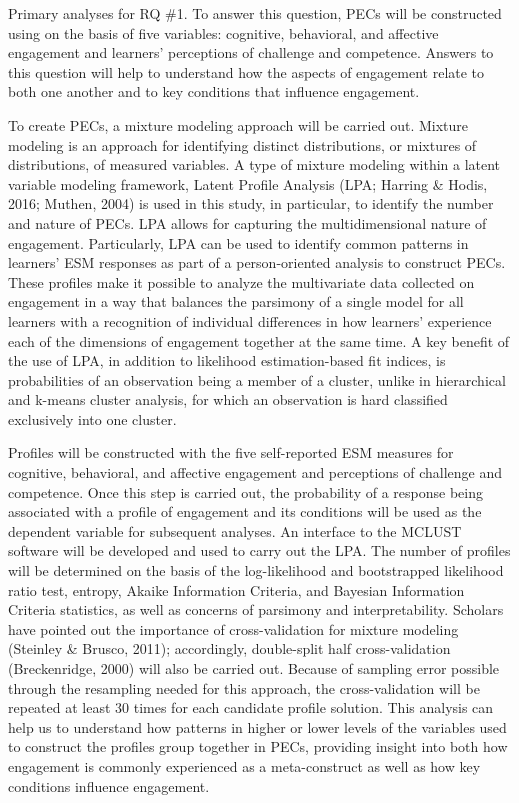 \documentclass[]{msu-thesis}
\theoremstyle{definition}
\theoremstyle{definition}
\theoremstyle{definition}
\theoremstyle{remark}
\begin{document}
Primary analyses for RQ \#1. To answer this question, PECs will be
constructed using on the basis of five variables: cognitive, behavioral,
and affective engagement and learners' perceptions of challenge and
competence. Answers to this question will help to understand how the
aspects of engagement relate to both one another and to key conditions
that influence engagement.

To create PECs, a mixture modeling approach will be carried out. Mixture
modeling is an approach for identifying distinct distributions, or
mixtures of distributions, of measured variables. A type of mixture
modeling within a latent variable modeling framework, Latent Profile
Analysis (LPA; Harring \& Hodis, 2016; Muthen, 2004) is used in this
study, in particular, to identify the number and nature of PECs. LPA
allows for capturing the multidimensional nature of engagement.
Particularly, LPA can be used to identify common patterns in learners'
ESM responses as part of a person-oriented analysis to construct PECs.
These profiles make it possible to analyze the multivariate data
collected on engagement in a way that balances the parsimony of a single
model for all learners with a recognition of individual differences in
how learners' experience each of the dimensions of engagement together
at the same time. A key benefit of the use of LPA, in addition to
likelihood estimation-based fit indices, is probabilities of an
observation being a member of a cluster, unlike in hierarchical and
k-means cluster analysis, for which an observation is hard classified
exclusively into one cluster.

Profiles will be constructed with the five self-reported ESM measures
for cognitive, behavioral, and affective engagement and perceptions of
challenge and competence. Once this step is carried out, the probability
of a response being associated with a profile of engagement and its
conditions will be used as the dependent variable for subsequent
analyses. An interface to the MCLUST software will be developed and used
to carry out the LPA. The number of profiles will be determined on the
basis of the log-likelihood and bootstrapped likelihood ratio test,
entropy, Akaike Information Criteria, and Bayesian Information Criteria
statistics, as well as concerns of parsimony and interpretability.
Scholars have pointed out the importance of cross-validation for mixture
modeling (Steinley \& Brusco, 2011); accordingly, double-split half
cross-validation (Breckenridge, 2000) will also be carried out. Because
of sampling error possible through the resampling needed for this
approach, the cross-validation will be repeated at least 30 times for
each candidate profile solution. This analysis can help us to understand
how patterns in higher or lower levels of the variables used to
construct the profiles group together in PECs, providing insight into
both how engagement is commonly experienced as a meta-construct as well
as how key conditions influence engagement.
\end{document}
